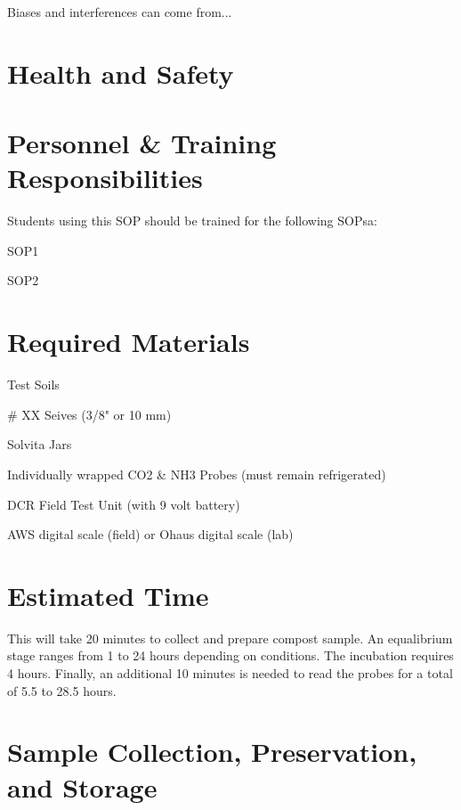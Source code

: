 \documentclass[12pt]{../SOP4_alpha}\usepackage[]{graphicx}\usepackage[]{xcolor}
\begin{document}
\NP Biases and interferences can come from...



\section{Health and Safety}



\section{Personnel \& Training Responsibilities}


Students using this SOP should be trained for the following SOPsa:

\begin{itemize*}
  \item SOP1
  \item SOP2
\end{itemize*}

\section{Required Materials}

\begin{itemize*}
  \item Test Soils
  \item \# XX Seives (3/8" or 10 mm)
  \item Solvita Jars
  \item Individually wrapped CO2 \& NH3 Probes (must remain refrigerated) 
  \item DCR Field Test Unit (with 9 volt battery)
  \item AWS digital scale (field) or Ohaus digital scale (lab)
\end{itemize*}

\section{Estimated Time}

\NP This will take 20 minutes to collect and prepare compost sample. An equalibrium stage ranges from 1 to 24 hours depending on conditions. The incubation requires 4 hours. Finally, an additional 10 minutes is needed to read the probes for a total of 5.5 to 28.5 hours.

\section{Sample Collection, Preservation, and Storage}
\end{document}
